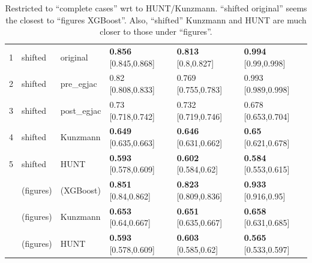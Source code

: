 \documentclass[12pt]{article}
\begin{document}
\begin{table}[ht]
\begin{tabular}{rlllll}
1 & shifted & original & \textbf{0.856} [0.845,0.868] & \textbf{0.813} [0.8,0.827] & \textbf{0.994} [0.99,0.998] \\ 
  2 & shifted & pre\_egjac & 0.82 [0.808,0.833] & 0.769 [0.755,0.783] & 0.993 [0.989,0.998] \\ 
  3 & shifted & post\_egjac & 0.73 [0.718,0.742] & 0.732 [0.719,0.746] & 0.678 [0.653,0.704] \\ 
  4 & shifted & Kunzmann & \textbf{0.649} [0.635,0.663] & \textbf{0.646} [0.631,0.662] & \textbf{0.65} [0.621,0.678] \\ 
  5 & shifted & HUNT & \textbf{0.593} [0.578,0.609] & \textbf{0.602} [0.584,0.62] & \textbf{0.584} [0.553,0.615] \\  \addlinespace
  
 & (figures) & (XGBoost) & \textbf{0.851} [0.84,0.862] & \textbf{0.823} [0.809,0.836] & \textbf{0.933} [0.916,0.95] \\
 & (figures) & Kunzmann & \textbf{0.653} [0.64,0.667] & \textbf{0.651} [0.635,0.667] & \textbf{0.658} [0.631,0.685] \\
 & (figures) & HUNT & \textbf{0.593} [0.578,0.609] & \textbf{0.603} [0.585,0.62] & \textbf{0.565} [0.533,0.597] \\
\bottomrule
\end{tabular}
\caption{Restricted to ``complete cases'' wrt to HUNT/Kunzmann. ``shifted original'' seems the closest to ``figures XGBoost''.
Also, ``shifted'' Kunzmann and HUNT are much closer to those under ``figures''.}
\end{table}
\end{document}
